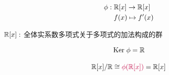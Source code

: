 \begin{frame}{}
  \begin{align*}
    \phi:\; & \mathbb{R}[x] \to \mathbb{R}[x] \\
            & f(x) \mapsto f'(x)
  \end{align*}

  \vspace{0.30cm}
  \begin{center}
    $\mathbb{R}[x]:$ 全体实系数多项式关于多项式的加法构成的群
  \end{center}

  \[
    \text{Ker}\; \phi = \mathbb{R}
  \]

  \pause
  \[
    \mathbb{R}[x]/\mathbb{R} \cong \textcolor{purple}{\phi(\mathbb{R}[x])} = \mathbb{R}[x]
  \]
\end{frame}
